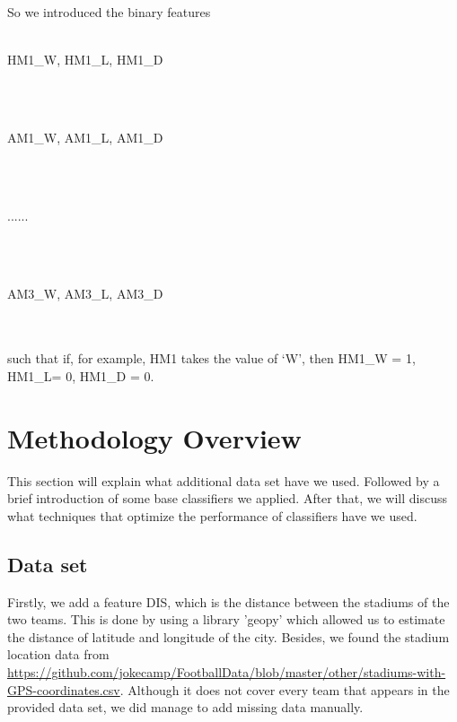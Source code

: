 \documentclass{article}
\begin{document}
So we introduced the binary features		\\\\
\centerline{HM1\_W, HM1\_L, HM1\_D}	\\\\
\centerline{AM1\_W, AM1\_L, AM1\_D}		\\\\	
\centerline{......}		\\\\
\centerline{AM3\_W, AM3\_L, AM3\_D}		\\\\
such that if, for example, HM1 takes the value of ‘W’,  then HM1\_W = 1, HM1\_L= 0, HM1\_D = 0. 

\section{Methodology Overview}
This section will explain what additional data set have we used. Followed by a brief introduction of some base classifiers we applied. After that, we will discuss what techniques that optimize the performance of classifiers have we used. 


\subsection{Data set}

Firstly, we add a feature DIS, which is the distance between the stadiums of the two teams. This is done by using a library 'geopy' which allowed us to estimate the distance of latitude and longitude of the city. Besides, we found the stadium location data from \url{https://github.com/jokecamp/FootballData/blob/master/other/stadiums-with-GPS-coordinates.csv}. Although it does not cover every team that appears in the provided data set, we did manage to add missing data manually.
\end{document}
